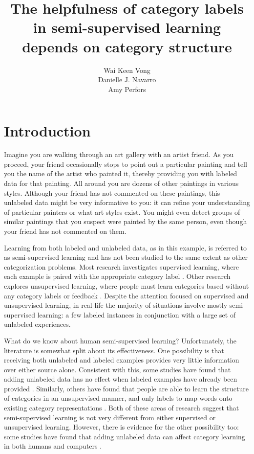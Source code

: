 \documentclass[a4paper, doc]{apa6}
\title{The helpfulness of category labels in semi-supervised learning depends on category structure}
\author{\normalsize Wai Keen Vong \\ Danielle J. Navarro \\ Amy Perfors}
\affiliation{\vspace*{6pt} School of Psychology \\ University of Adelaide}
\date{}
\begin{document}
\maketitle

\section{Introduction}


Imagine you are walking through an art gallery with an artist friend. As you proceed, your friend occasionally stops to point out a particular painting and tell you the name of the artist who painted it, thereby providing you with labeled data for that painting. All around you are dozens of other paintings in various styles.
Although your friend has not commented on these paintings, this unlabeled data might be very informative to you: it can refine your understanding of particular painters or what art styles exist. You might even detect groups of similar paintings that you suspect were painted by the same person, even though your friend has not commented on them.

Learning from both labeled and unlabeled data, as in this example, is referred to as semi-supervised learning \cite{zhu2007humans, gibson2013human} and has not been studied to the same extent as other categorization problems. Most research investigates supervised learning, where each example is paired with the appropriate category label \cite{medin1978context, nosofsky1986attention}. Other research explores  unsupervised learning, where people must learn categories based without any category labels or feedback \cite{love2002comparing, pothos2002simplicity, pothos2011measuring}. Despite the attention focused on supervised and unsupervised learning, in real life the majority of situations involve mostly semi-supervised learning: a few labeled instances in conjunction with a large set of unlabeled experiences.

What do we know about human semi-supervised learning? Unfortunately, the literature is somewhat split about its effectiveness. One possibility is that receiving both unlabeled and labeled examples provides very little information over either source alone. Consistent with this, some studies have found that adding unlabeled data has no effect when labeled examples have already been provided \cite{vandist2009semisupervised,mcdonnell2012sparse}. Similarly, others have found that people are able to learn the structure of categories in an unsupervised manner, and only labels to map words onto existing category representations \cite{bloom2002children}. Both of these areas of research suggest that semi-supervised learning is not very different from either supervised or unsupervised learning. However, there is evidence for the other possibility too: some studies have found that adding unlabeled data can affect category learning in both humans \cite{zhu2007humans,lake2011estimating,kalish2011can, gibson2013human} and computers \cite{chapelle2006semi}.
\end{document}
